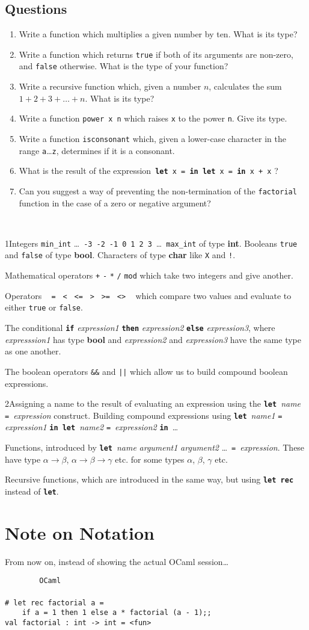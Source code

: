 \documentclass[]{book}
\newcommand\upquote[1]{\textquotesingle#1\textquotesingle}
\newcommand{\sofarstartingoff}{

\noindent \lettrine[loversize=0.1,nindent=0em]{1}{}Integers \texttt{min\_int} \ldots\ \texttt{-3}\ \texttt{-2}\ \texttt{-1}\ \texttt{0}\ \texttt{1}\ \texttt{2}\ \texttt{3}\ \ldots\ \texttt{max\_int} of type \textbf{\textsf{int}}. Booleans \texttt{true} and \texttt{false} of type \textbf{\textsf{bool}}. \noindent Characters of type \textsf{\textbf{char}} like \texttt{\upquote{X}} and \texttt{\upquote{!}}.
\vspace{2mm}

\noindent Mathematical operators \texttt{+} \texttt{-} \texttt{*} \texttt{/} \texttt{mod} which take two integers and give another.

\vspace{2mm}

\noindent Operators \ \!\! \texttt{=\ \!\!} \texttt{<\ \!\!} \texttt{<=\ \!\!} \texttt{>\ \!\!} \texttt{>=\ \!\!} \texttt{<>} \ \!\! which compare two values and evaluate to either \texttt{true} or \texttt{false}.

\vspace{2mm}

\noindent The conditional \textbf{\texttt{if}} \textit{expression1} \textbf{\texttt{then}} \textit{expression2} \textbf{\texttt{else}} \textit{expression3}, where \textit{expresssion1} has type \textsf{\textbf{bool}} and \textit{expression2} and \textit{expression3} have the same type as one another.

\vspace{2mm}

\noindent The boolean operators \texttt{\&\&} and \texttt{||} which allow us to build compound boolean expressions.}
\newcommand{\sofarfunctions}
{
\noindent\lettrine[loversize=0.1,findent=2pt,nindent=0em]{2}{}Assigning a name to the result of evaluating an expression using the \textbf{\texttt{let}}\ \textit{name} \texttt{=}\ \textit{expression} construct. Building compound expressions using \textbf{\texttt{let}}\ \textit{name1} \texttt{=} \textit{expression1} \textbf{\texttt{in}}\ \textbf{\texttt{let}}\ \textit{name2} \texttt{=}\ \textit{expression2} \textbf{\texttt{in}}\ \ldots

\vspace{2mm} 

\noindent Functions, introduced by \textbf{\texttt{let}}\ \textit{name} \textit{argument1} \textit{argument2} \ldots\ \texttt{=}\ \textit{expression}. These have type $\alpha \rightarrow \beta$, $\alpha \rightarrow \beta \rightarrow \gamma$ etc. for some types $\alpha$, $\beta$, $\gamma$ etc.

\vspace{2mm}

\noindent Recursive functions, which are introduced in the same way, but using \textbf{\texttt{let\!\! rec}} instead of \textbf{\texttt{let}}.}
\newcommand{\smspace}{\vspace{4mm}}
\begin{document}
\clearpage
\section*{Questions}

\begin{enumerate}
 \item Write a function which multiplies a given number by ten. What is its type?
 \item Write a function which returns \texttt{true} if both of its arguments are non-zero, and \texttt{false} otherwise. What is the type of your function?
 \item Write a recursive function which, given a number $n$, calculates the sum $1 + 2 + 3 + \ldots + n$. What is its type?
 \item Write a function \texttt{power\! x\! n} which raises \texttt{x} to the power \texttt{n}. Give its type.
 \item Write a function \texttt{isconsonant} which, given a lower-case character in the range \texttt{\upquote{a}}\ldots\texttt{\upquote{z}}, determines if it is a consonant.
 \item What is the result of the expression\, \texttt{\textbf{let}\! x\! =\! \textbf{in}\! \textbf{let}\! x\! =\! \textbf{in}\! x\! +\! x} ?
 \item Can you suggest a way of preventing the non-termination of the \texttt{factorial} function in the case of a zero or negative argument?
\end{enumerate}

\cleardoublepage
\pagestyle{empty}
\\

\begin{multicols*}{2}
\footnotesize
\sofarstartingoff

\vspace{\baselineskip}
\sofarfunctions

\end{multicols*}

\pagestyle{empty}

\chapter*{Note on Notation}

From now on, instead of showing the actual OCaml session\ldots

\smspace
\noindent\verb!        OCaml!\\
\noindent\\
\noindent\verb!# let rec factorial a =!\\
\noindent\verb!    if a = 1 then 1 else a * factorial (a - 1);;!\\
\noindent\verb!val factorial : int -> int = <fun>!
\smspace
\end{document}
